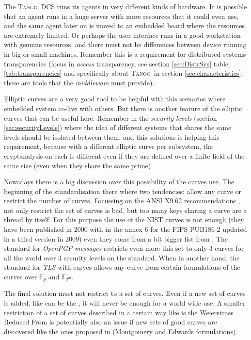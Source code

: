 \documentclass[10pt,a4paper,twoside]{llncs}
\newcommand{\tango}{\textsc{Tango}}
\begin{document}
The \tango\, DCS runs its agents in very different kinds of hardware. It is possible that an agent runs in a huge server with more resources that it could even use, and the same agent later on is moved to an embedded board where the resources are extremely limited. Or perhaps the user interface runs in a good workstation with genuine resources, and there must not be differences between device running in big or small machines. Remember this is a requirement for distributed systems transparencies (focus in \emph{access} transparency, see section \ref{sec:DistrSys} table \ref{tab:transparencies} and specifically about \tango\, in section \ref{sec:characteristics}, these are tools that the \emph{middleware} must provide).

Elliptic curves are a very good tool to be helpful with this scenarios where embedded system co-live with others. But there is another feature of the elliptic curves that can be useful here. Remember in the \emph{security levels} (section \ref{sec:securityLevels}) where the idea of different systems that shares the same levels should be isolated between them, and this solutions is helping this requirement, because with a different elliptic curve per subsystem, the cryptanalysis on each is different even if they are defined over  a finite field of the same size (even when they share the same prime).

Nowadays there is a big discussion over this possibility of the curves use. The beginning of the standardisation there where two tendencies: allow any curve or restrict the number of curves. Focussing on the ANSI X9.62 recommendations \cite{X9.62-1998}, not only restrict the set of curves is bad, but too many keys sharing a curve are a thread by itself. For this purpose the use of the NIST curves is not enough (they have been published in 2000 with in the annex 6 for the FIPS PUB186-2 updated in a third version \cite{NIST186-3} in 2009) even they come from a bit bigger list from \cite{sec2}. The standard for \emph{OpenPGP messages} \cite{rfc6637} restricts even more this set to only 3 curves for all the world over 3 security levels on the standard. When in another hand, the standard for \emph{TLS} with curves \cite{rfc4492} allows any curve from certain formulations of the curves over \ensuremath{\mathbb{F}_{p}} and \ensuremath{\mathbb{F}_{2^m}}.

The final solution must not restrict to a set of curves. Even if a new set of curves is added, like can be the \cite{brainpool}, it will never be enough for a world wide use. A smaller restriction of a set of curves described in a certain way like is the Weierstrass Reduced From is potentially also an issue if new sets of good curves are discovered like the ones proposed in \cite{cryptoeprint:2013:647} (Montgomery and Edwards formulations).
\end{document}
